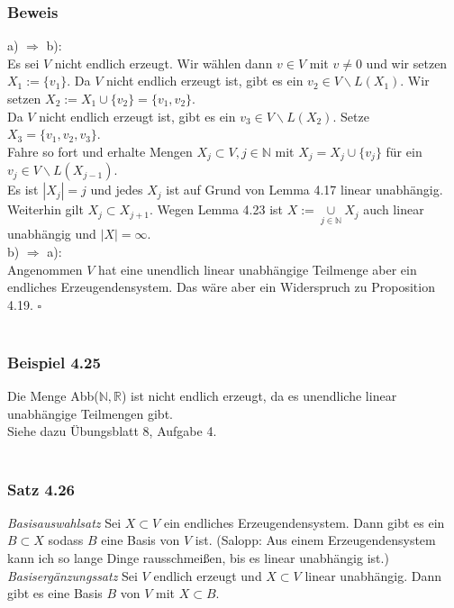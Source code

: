 \documentclass{article}
\begin{document}
\subsubsection*{Beweis}
a) $\Rightarrow$ b): \\
Es sei $V$ nicht endlich erzeugt. Wir wählen dann $v \in V$ mit $v \neq 0$ und wir setzen $X_1 := \{v_1\}$.
Da $V$ nicht endlich erzeugt ist, gibt es ein $v_2 \in V \backslash L(X_1)$. Wir setzen $X_2 := X_1 \cup \{v_2\} = \{v_1, v_2\}$. \\
Da $V$ nicht endlich erzeugt ist, gibt es ein $v_3 \in V \backslash L(X_2)$. Setze $X_3 = \{v_1, v_2, v_3\}$. \\
Fahre so fort und erhalte Mengen $X_j \subset V, j \in \mathbb{N}$ mit $X_j = X_j \cup \{v_j\}$ für ein $v_j \in V \backslash L(X_{j-1})$. \\
Es ist $|X_j| = j$ und jedes $X_j$ ist auf Grund von Lemma 4.17 linear unabhängig. \\
Weiterhin gilt $X_j \subset X_{j+1}$. Wegen Lemma 4.23 ist $X := \underset{j \in \mathbb{N}}{\cup} X_j$ auch linear unabhängig und $|X| = \infty$. \\
b) $\Rightarrow$ a): \\
Angenommen $V$ hat eine unendlich linear unabhängige Teilmenge aber ein endliches Erzeugendensystem. Das wäre aber ein Widerspruch zu Proposition 4.19. $\square$ \\
\\
\subsubsection*{Beispiel 4.25}
Die Menge Abb($\mathbb{N}, \mathbb{R}$) ist nicht endlich erzeugt, da es unendliche linear unabhängige Teilmengen gibt. \\
Siehe dazu Übungsblatt 8, Aufgabe 4. \\
\\
\subsubsection*{Satz 4.26}
\textit{Basisauswahlsatz}
Sei $X \subset V$ ein endliches Erzeugendensystem. Dann gibt es ein $B \subset X$ sodass $B$ eine Basis von $V$ ist. 
(Salopp: Aus einem Erzeugendensystem kann ich so lange Dinge rausschmeißen, bis es linear unabhängig ist.) \\
\textit{Basisergänzungssatz}
Sei $V$ endlich erzeugt und $X \subset V$ linear unabhängig. Dann gibt es eine Basis $B$ von $V$ mit $X \subset B$. \\
\\
\end{document}
